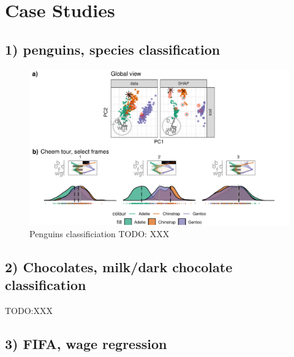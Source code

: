 \documentclass[
]{article}
\begin{document}
\hypertarget{sec:casestudies}{%
\section{Case Studies}\label{sec:casestudies}}

\hypertarget{penguins-species-classification}{%
\subsection{1) penguins, species classification}\label{penguins-species-classification}}

\begin{figure}

{\centering \includegraphics[width=1\linewidth]{./figures/case_penguins} 

}

\caption{Penguins classificiation TODO: XXX}\label{fig:casepenguins}
\end{figure}

\hypertarget{chocolates-milkdark-chocolate-classification}{%
\subsection{2) Chocolates, milk/dark chocolate classification}\label{chocolates-milkdark-chocolate-classification}}

TODO:XXX

\hypertarget{fifa-wage-regression}{%
\subsection{3) FIFA, wage regression}\label{fifa-wage-regression}}
\end{document}
